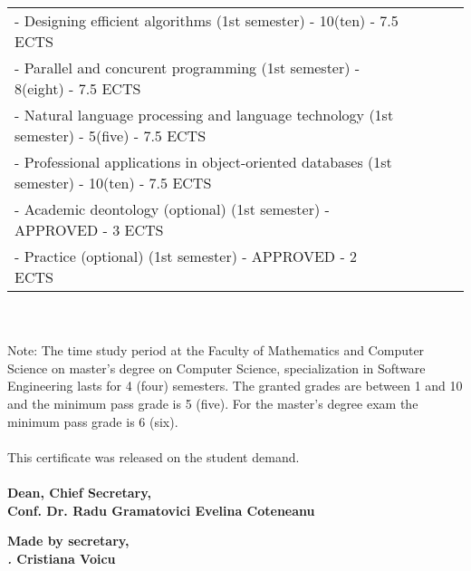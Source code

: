 \documentclass[a4paper,9pt,final]{scrartcl}
\begin{document}
\begin{tabular}{llcll}
\hspace{3em} - Designing efficient algorithms (1st semester) - 10(ten) - 7.5 ECTS \\
\hspace{3em} - Parallel and concurent programming (1st semester) - 8(eight) - 7.5 ECTS \\
\hspace{3em} - Natural language processing and language technology (1st semester) - 5(five) - 7.5 ECTS \\
\hspace{3em} - Professional applications in object-oriented databases (1st semester) - 10(ten) - 7.5 ECTS \\
\hspace{3em} - Academic deontology (optional) (1st semester) - APPROVED - 3 ECTS \\
\hspace{3em} - Practice (optional) (1st semester) - APPROVED - 2 ECTS
\end{tabular}
\begin{small}
\\
\vspace{3em}
\\
Note: The time study period at the Faculty of Mathematics and Computer Science on master's degree on Computer Science, specialization in Software Engineering lasts for 4 (four) semesters. 
The granted grades are between 1 and 10 and the minimum
pass grade is 5 (five). For the master's degree exam the minimum pass grade is 6 (six).
\end{small}
\paragraph{}
This certificate was released on the student demand.
\vspace{50pt}
\paragraph{}
\begin{Large}
	\textbf{Dean,  \hfill Chief Secretary,\\
	Conf. Dr. Radu Gramatovici \hfill  Evelina Coteneanu
		}
\end{Large}


\vspace{75pt}
\begin{Large}
\hfill \textbf{Made by secretary,\\
\textit{.} \hfill Cristiana Voicu}
\end{Large}
\hfill
	
\end{document}
